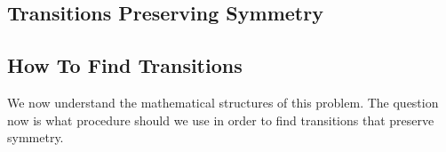 \documentclass[a4paper,10pt]{article}
\theoremstyle{plain}
\theoremstyle{definition}
\theoremstyle{remark}
\begin{document}

\subsection{Transitions Preserving Symmetry}\label{subsection:transitions-preserving-symmetry}

\subsection{How To Find Transitions}
We now understand the mathematical structures of this problem.
The question now is what procedure should we use in order to find transitions that preserve symmetry.
\end{document}
